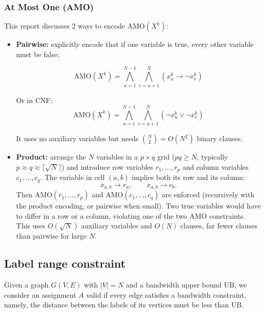 \documentclass[a4paper,fleqn]{cas-sc}
\begin{document}
        \subsubsection{At Most One (AMO)}
            \noindent This report discusses 2 ways to encode $\text{AMO}(X^k)$:
            \begin{itemize}
                \item \textbf{Pairwise:} explicitly encode that if one variable is true, every other variable must be false:
                
                \begin{equation}
                    \text{AMO}(X^k) = \bigwedge_{u=1}^{N-1}
                    \bigwedge_{v=u+1}^{N}
                    \left(x_u^k \rightarrow \neg x_v^k\right)
                \end{equation}

                Or in CNF:
                \begin{equation}
                    \text{AMO}(X^k) = \bigwedge_{u=1}^{N-1}
                    \bigwedge_{v=u+1}^{N}
                    \left(\neg x_u^k \vee \neg x_v^k\right)
                \end{equation}

                It uses no auxiliary variables but needs $\binom{N}{2} = O(N^2)$ binary clauses.

                \item \textbf{Product:} arrange the $N$ variables in a $p \times q$ grid ($pq \ge N$, typically $p \approx q \approx \lceil\sqrt{N}\rceil$) and introduce row variables $r_1,\dots,r_p$ and column variables $c_1,\dots,c_q$. The variable in cell $(a,b)$ implies both its row and its column:
                    \begin{equation}
                        x_{a,b} \rightarrow r_a, \qquad x_{a,b} \rightarrow c_b.
                    \end{equation}
                    Then $\text{AMO}(r_1,\dots,r_p)$ and $\text{AMO}(c_1,\dots,c_q)$ are enforced (recursively with the product encoding, or pairwise when small). Two true variables would have to differ in a row or a column, violating one of the two AMO constraints. This uses $O(\sqrt{N})$ auxiliary variables and $O(N)$ clauses, far fewer clauses than pairwise for large $N$.
            \end{itemize}


    \subsection{Label range constraint}
        Given a graph $G(V,E)$ with $|V|=N$ and a bandwidth upper bound $\text{UB}$, we consider an assignment $A$ valid if every edge satisfies a bandwidth constraint, namely, the distance between the labels of its vertices must be less than UB.
        
\end{document}
